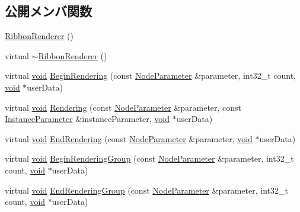 \subsection*{公開メンバ関数}
\begin{DoxyCompactItemize}
\item 
\mbox{\hyperlink{class_effekseer_1_1_ribbon_renderer_a6ad9eea3ef4aa2edaf9011efedf4ccd5}{Ribbon\+Renderer}} ()
\item 
virtual \mbox{\hyperlink{class_effekseer_1_1_ribbon_renderer_a09d2d5d1f817b37430b6984be166c43e}{$\sim$\+Ribbon\+Renderer}} ()
\item 
virtual \mbox{\hyperlink{namespace_effekseer_ab34c4088e512200cf4c2716f168deb56}{void}} \mbox{\hyperlink{class_effekseer_1_1_ribbon_renderer_a9a41bef1c1c28eba5b331d72e1e4e38b}{Begin\+Rendering}} (const \mbox{\hyperlink{struct_effekseer_1_1_ribbon_renderer_1_1_node_parameter}{Node\+Parameter}} \&parameter, int32\+\_\+t count, \mbox{\hyperlink{namespace_effekseer_ab34c4088e512200cf4c2716f168deb56}{void}} $\ast$user\+Data)
\item 
virtual \mbox{\hyperlink{namespace_effekseer_ab34c4088e512200cf4c2716f168deb56}{void}} \mbox{\hyperlink{class_effekseer_1_1_ribbon_renderer_a3d1991348eeba97aa02c8082455edd39}{Rendering}} (const \mbox{\hyperlink{struct_effekseer_1_1_ribbon_renderer_1_1_node_parameter}{Node\+Parameter}} \&parameter, const \mbox{\hyperlink{struct_effekseer_1_1_ribbon_renderer_1_1_instance_parameter}{Instance\+Parameter}} \&instance\+Parameter, \mbox{\hyperlink{namespace_effekseer_ab34c4088e512200cf4c2716f168deb56}{void}} $\ast$user\+Data)
\item 
virtual \mbox{\hyperlink{namespace_effekseer_ab34c4088e512200cf4c2716f168deb56}{void}} \mbox{\hyperlink{class_effekseer_1_1_ribbon_renderer_ae8e99c5d635d3128047017c0f3c595bd}{End\+Rendering}} (const \mbox{\hyperlink{struct_effekseer_1_1_ribbon_renderer_1_1_node_parameter}{Node\+Parameter}} \&parameter, \mbox{\hyperlink{namespace_effekseer_ab34c4088e512200cf4c2716f168deb56}{void}} $\ast$user\+Data)
\item 
virtual \mbox{\hyperlink{namespace_effekseer_ab34c4088e512200cf4c2716f168deb56}{void}} \mbox{\hyperlink{class_effekseer_1_1_ribbon_renderer_aff959e008c9c35c170ea835eb4a66b35}{Begin\+Rendering\+Group}} (const \mbox{\hyperlink{struct_effekseer_1_1_ribbon_renderer_1_1_node_parameter}{Node\+Parameter}} \&parameter, int32\+\_\+t count, \mbox{\hyperlink{namespace_effekseer_ab34c4088e512200cf4c2716f168deb56}{void}} $\ast$user\+Data)
\item 
virtual \mbox{\hyperlink{namespace_effekseer_ab34c4088e512200cf4c2716f168deb56}{void}} \mbox{\hyperlink{class_effekseer_1_1_ribbon_renderer_a9c86184fdf1123a6bdd557540c71ff5e}{End\+Rendering\+Group}} (const \mbox{\hyperlink{struct_effekseer_1_1_ribbon_renderer_1_1_node_parameter}{Node\+Parameter}} \&parameter, int32\+\_\+t count, \mbox{\hyperlink{namespace_effekseer_ab34c4088e512200cf4c2716f168deb56}{void}} $\ast$user\+Data)
\end{DoxyCompactItemize}


